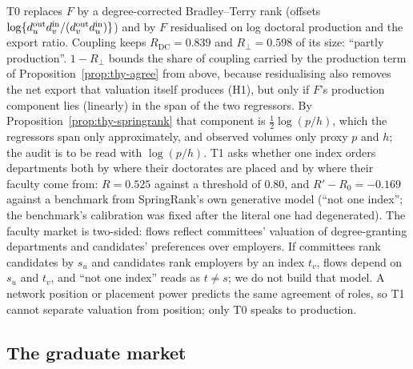 \begin{thyremark}\label{rem:thy-audits}
T0 replaces $F$ by a degree-corrected Bradley--Terry rank (offsets
$\log\{d^{\rm out}_ud^{\rm in}_v/(d^{\rm out}_vd^{\rm in}_u)\}$) and by $F$ residualised on log doctoral production and
the export ratio. Coupling keeps $R_{\mathrm{DC}}=0.839$  and $R_\perp=0.598$  of
its size: ``partly production''. $1-R_\perp$ bounds the share of coupling carried by the production term of
Proposition~\ref{prop:thy-agree} from above, because residualising also removes the net export that valuation
itself produces (H1), but only if $F$'s production component lies (linearly) in the span of the two regressors. By
Proposition~\ref{prop:thy-springrank} that component is $\tfrac12\log(p/h)$, which the regressors span only
approximately, and observed volumes only proxy $p$ and $h$; the audit is to be read with $\log(p/h)$. T1 asks whether one index orders departments both by where their
doctorates are placed and by where their faculty come from: $R=0.525$  against a threshold of 0.80,
and $R'-R_0=-0.169$  against a benchmark from SpringRank's own generative model (``not one
index''; the benchmark's calibration was fixed after the literal one had degenerated). The faculty market is
two-sided: flows reflect committees' valuation of degree-granting departments and candidates' preferences over
employers. If committees rank candidates by $s_u$ and candidates rank employers by an index $t_v$, flows depend on
$s_u$ and $t_v$, and ``not one index'' reads as $t\neq s$; we do not build that model. A network position or placement
power predicts the same agreement of roles, so T1 cannot separate valuation from position; only T0 speaks to
production.
\end{thyremark}

\subsection{The graduate market}\label{app:thy:market}

